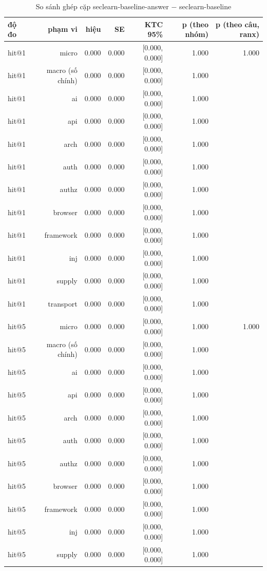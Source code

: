 \begin{table}[ht]
\centering
\caption{So sánh ghép cặp seclearn-baseline-answer $-$ seclearn-baseline}
\begin{tabular}{lrrrrrr}
\toprule
độ đo & phạm vi & hiệu & SE & KTC 95\% & p (theo nhóm) & p (theo câu, ranx) \\
\midrule
hit@1 & micro & 0.000 & 0.000 & [0.000, 0.000] & 1.000 & 1.000 \\
hit@1 & macro (số chính) & 0.000 & 0.000 & [0.000, 0.000] & 1.000 &  \\
hit@1 & ai & 0.000 & 0.000 & [0.000, 0.000] & 1.000 &  \\
hit@1 & api & 0.000 & 0.000 & [0.000, 0.000] & 1.000 &  \\
hit@1 & arch & 0.000 & 0.000 & [0.000, 0.000] & 1.000 &  \\
hit@1 & auth & 0.000 & 0.000 & [0.000, 0.000] & 1.000 &  \\
hit@1 & authz & 0.000 & 0.000 & [0.000, 0.000] & 1.000 &  \\
hit@1 & browser & 0.000 & 0.000 & [0.000, 0.000] & 1.000 &  \\
hit@1 & framework & 0.000 & 0.000 & [0.000, 0.000] & 1.000 &  \\
hit@1 & inj & 0.000 & 0.000 & [0.000, 0.000] & 1.000 &  \\
hit@1 & supply & 0.000 & 0.000 & [0.000, 0.000] & 1.000 &  \\
hit@1 & transport & 0.000 & 0.000 & [0.000, 0.000] & 1.000 &  \\
hit@5 & micro & 0.000 & 0.000 & [0.000, 0.000] & 1.000 & 1.000 \\
hit@5 & macro (số chính) & 0.000 & 0.000 & [0.000, 0.000] & 1.000 &  \\
hit@5 & ai & 0.000 & 0.000 & [0.000, 0.000] & 1.000 &  \\
hit@5 & api & 0.000 & 0.000 & [0.000, 0.000] & 1.000 &  \\
hit@5 & arch & 0.000 & 0.000 & [0.000, 0.000] & 1.000 &  \\
hit@5 & auth & 0.000 & 0.000 & [0.000, 0.000] & 1.000 &  \\
hit@5 & authz & 0.000 & 0.000 & [0.000, 0.000] & 1.000 &  \\
hit@5 & browser & 0.000 & 0.000 & [0.000, 0.000] & 1.000 &  \\
hit@5 & framework & 0.000 & 0.000 & [0.000, 0.000] & 1.000 &  \\
hit@5 & inj & 0.000 & 0.000 & [0.000, 0.000] & 1.000 &  \\
hit@5 & supply & 0.000 & 0.000 & [0.000, 0.000] & 1.000 &  \\

\end{tabular}
\end{table}

